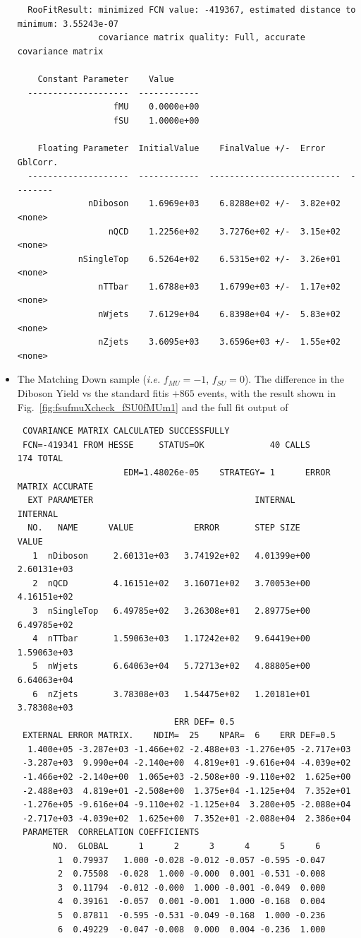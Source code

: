 \begin{itemize}
{\begin{verbatim}
  RooFitResult: minimized FCN value: -419367, estimated distance to minimum: 3.55243e-07
                covariance matrix quality: Full, accurate covariance matrix

    Constant Parameter    Value     
  --------------------  ------------
                   fMU    0.0000e+00
                   fSU    1.0000e+00

    Floating Parameter  InitialValue    FinalValue +/-  Error     GblCorr.
  --------------------  ------------  --------------------------  --------
              nDiboson    1.6969e+03    6.8288e+02 +/-  3.82e+02  <none>
                  nQCD    1.2256e+02    3.7276e+02 +/-  3.15e+02  <none>
            nSingleTop    6.5264e+02    6.5315e+02 +/-  3.26e+01  <none>
                nTTbar    1.6788e+03    1.6799e+03 +/-  1.17e+02  <none>
                nWjets    7.6129e+04    6.8398e+04 +/-  5.83e+02  <none>
                nZjets    3.6095e+03    3.6596e+03 +/-  1.55e+02  <none>

\end{verbatim}
}


\item The Matching Down sample (\textit{i.e.} $f_{MU}=-1$, $f_{SU}=0$). The difference in the Diboson Yield vs the standard fitis $+865$ events, with the result shown in Fig.~\ref{fig:fsufmuXcheck_fSU0fMUm1} and the full fit output of
{\tiny
\begin{verbatim}
 COVARIANCE MATRIX CALCULATED SUCCESSFULLY
 FCN=-419341 FROM HESSE     STATUS=OK             40 CALLS         174 TOTAL
                     EDM=1.48026e-05    STRATEGY= 1      ERROR MATRIX ACCURATE 
  EXT PARAMETER                                INTERNAL      INTERNAL  
  NO.   NAME      VALUE            ERROR       STEP SIZE       VALUE   
   1  nDiboson     2.60131e+03   3.74192e+02   4.01399e+00   2.60131e+03
   2  nQCD         4.16151e+02   3.16071e+02   3.70053e+00   4.16151e+02
   3  nSingleTop   6.49785e+02   3.26308e+01   2.89775e+00   6.49785e+02
   4  nTTbar       1.59063e+03   1.17242e+02   9.64419e+00   1.59063e+03
   5  nWjets       6.64063e+04   5.72713e+02   4.88805e+00   6.64063e+04
   6  nZjets       3.78308e+03   1.54475e+02   1.20181e+01   3.78308e+03
                               ERR DEF= 0.5
 EXTERNAL ERROR MATRIX.    NDIM=  25    NPAR=  6    ERR DEF=0.5
  1.400e+05 -3.287e+03 -1.466e+02 -2.488e+03 -1.276e+05 -2.717e+03 
 -3.287e+03  9.990e+04 -2.140e+00  4.819e+01 -9.616e+04 -4.039e+02 
 -1.466e+02 -2.140e+00  1.065e+03 -2.508e+00 -9.110e+02  1.625e+00 
 -2.488e+03  4.819e+01 -2.508e+00  1.375e+04 -1.125e+04  7.352e+01 
 -1.276e+05 -9.616e+04 -9.110e+02 -1.125e+04  3.280e+05 -2.088e+04 
 -2.717e+03 -4.039e+02  1.625e+00  7.352e+01 -2.088e+04  2.386e+04 
 PARAMETER  CORRELATION COEFFICIENTS  
       NO.  GLOBAL      1      2      3      4      5      6
        1  0.79937   1.000 -0.028 -0.012 -0.057 -0.595 -0.047
        2  0.75508  -0.028  1.000 -0.000  0.001 -0.531 -0.008
        3  0.11794  -0.012 -0.000  1.000 -0.001 -0.049  0.000
        4  0.39161  -0.057  0.001 -0.001  1.000 -0.168  0.004
        5  0.87811  -0.595 -0.531 -0.049 -0.168  1.000 -0.236
        6  0.49229  -0.047 -0.008  0.000  0.004 -0.236  1.000


\end{verbatim}}
\end{itemize}

